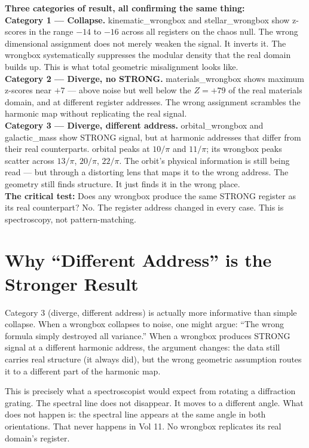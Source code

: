 \documentclass[11pt, letterpaper, openany]{book}
\begin{document}
\begin{dimensionbox}
\textbf{Three categories of result, all confirming the same thing:}\\[0.5em]
\textbf{Category 1 --- Collapse.} kinematic\_wrongbox and stellar\_wrongbox show
z-scores in the range $-14$ to $-16$ across all registers on the chaos null.
The wrong dimensional assignment does not merely weaken the signal. It inverts
it. The wrongbox systematically suppresses the modular density that the real
domain builds up. This is what total geometric misalignment looks like.\\[0.5em]
\textbf{Category 2 --- Diverge, no STRONG.} materials\_wrongbox shows maximum
z-scores near $+7$ --- above noise but well below the $Z=+79$ of the real
materials domain, and at different register addresses. The wrong assignment
scrambles the harmonic map without replicating the real signal.\\[0.5em]
\textbf{Category 3 --- Diverge, different address.} orbital\_wrongbox and
galactic\_mass show STRONG signal, but at harmonic addresses that differ from
their real counterparts. orbital peaks at $10/\pi$ and $11/\pi$; its wrongbox
peaks scatter across $13/\pi$, $20/\pi$, $22/\pi$. The orbit's physical
information is still being read --- but through a distorting lens that maps
it to the wrong address. The geometry still finds structure. It just finds it
in the wrong place.\\[0.5em]
\textbf{The critical test:} Does any wrongbox produce the same STRONG register
as its real counterpart? No. The register address changed in every case. This
is spectroscopy, not pattern-matching.
\end{dimensionbox}

\section{Why ``Different Address'' is the Stronger Result}

Category 3 (diverge, different address) is actually more informative than
simple collapse. When a wrongbox collapses to noise, one might argue: ``The
wrong formula simply destroyed all variance.'' When a wrongbox produces STRONG
signal at a different harmonic address, the argument changes: the data still
carries real structure (it always did), but the wrong geometric assumption
routes it to a different part of the harmonic map.

This is precisely what a spectroscopist would expect from rotating a diffraction
grating. The spectral line does not disappear. It moves to a different angle.
What does not happen is: the spectral line appears at the same angle in both
orientations. That never happens in Vol 11. No wrongbox replicates its real
domain's register.
\end{document}
